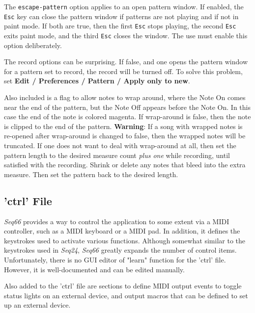    The \texttt{escape-pattern} option applies to an open pattern window.
   If enabled, the \texttt{Esc} key can close the pattern window if
   patterns are not playing and if not in paint mode.  If both are true, then
   the first \texttt{Esc} stops playing, the second \texttt{Esc} exits
   paint mode, and the third \texttt{Esc} closes the window.
   The use must enable this option deliberately.

   The record options can be surprising. If false, and
   one opens the pattern window for a pattern set to record, the
   record will be turned off.
   To solve this problem, set
   \textbf{Edit / Preferences / Pattern / Apply only to new}.

   Also included is a flag to allow notes to wrap around, where the Note On
   comes near the end of the pattern, but the Note Off appears before the
   Note On.
   In this case the end of the note is colored magenta.
   If wrap-around is false, then the note is clipped to the end of the pattern.
   \textbf{Warning}:
   If a song with wrapped notes is re-opened after wrap-around is changed
   to false, then the wrapped notes will be truncated.
   If one does not want to deal with wrap-around at all, then set the pattern
   length to the desired measure count \textsl{plus one} while recording, until
   satisfied with the recording.  Shrink or delete any notes that bleed into
   the extra measure. Then set the pattern back to the desired length.

\subsection{'ctrl' File}
\label{subsec:configuration_ctrl}

   \textsl{Seq66} provides a way to control the
   application to some extent via a MIDI controller, such as a MIDI keyboard or
   a MIDI pad.
   In addition, it defines the keystrokes used to activate various functions.
   Although somewhat similar to the keystrokes used in \textsl{Seq24},
   \textsl{Seq66} greatly expands the number of control items.
   Unfortunately, there is no GUI editor of "learn" function for the
   'ctrl' file.
   However, it is well-documented and can be edited manually.

   Also added to the 'ctrl' file are sections to define MIDI output events to
   toggle status lights on an external device, and
   output macros that can be defined to set up an external device.

